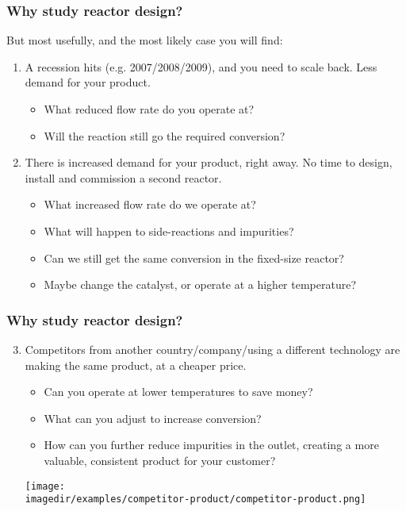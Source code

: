 \begin{frame}\frametitle{Why study reactor design?}
	But most usefully, and the most likely case you will find: 
	\begin{exampleblock}{}
		{\color{myOrange}{You are working at an existing plant, with the reactor running for many years and producing product profitably.}}
	\end{exampleblock}
	\vspace{12pt}
	\begin{enumerate}
		\item	A recession hits (e.g. 2007/2008/2009), and you need to scale back. Less demand for your product.
		\begin{itemize}
			\item	What reduced flow rate do you operate at?
			\item	Will the reaction still go the required conversion?
		\end{itemize}
		\vspace{12pt}
		\item	There is increased demand for your product, right away. No time to design, install and commission a second reactor.
		\begin{itemize}
			\item	What increased flow rate do we operate at?
			\item	What will happen to side-reactions and impurities?
			\item	Can we still get the same conversion in the fixed-size reactor?
			\item	Maybe change the catalyst, or operate at a higher temperature?
		\end{itemize}
	\end{enumerate}
\end{frame}

\begin{frame}\frametitle{Why study reactor design?}
	\begin{enumerate}
		\setcounter{enumi}{2}
		\item	Competitors from another country/company/using a different technology are making the same product, at a cheaper price.
		\begin{itemize}
			\item	Can you operate at lower temperatures to save money?
			\item	What can you adjust to increase conversion?
			\item	How can you further reduce impurities in the outlet, creating a more valuable, consistent product for your customer?
		\end{itemize}
		\begin{center}
			\texttt{[image: \\imagedir/examples/competitor-product/competitor-product.png]}
		\end{center}
	\end{enumerate}
\end{frame}

